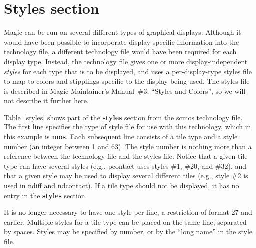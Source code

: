 \documentclass[letterpaper,twoside,12pt]{article}
\begin{document}
\section{Styles section}

Magic can be run on several different types of graphical displays.
Although it would have been possible to incorporate display-specific
information into the technology file,
a different technology file would have been required for each display type.
Instead, the technology file gives one or more display-independent
{\itshape styles} for each type that is to be displayed,
and uses a per-display-type styles file to map to
colors and stipplings specific to the display being used.  The
styles file is described in
Magic Maintainer's Manual\ \#3: ``Styles and Colors'',
so we will not describe it further here.

Table~\ref{styles} shows part of the {\bfseries styles}
section from the scmos technology file.
The first line specifies the type of style file
for use with this technology, which in this
example is {\bfseries mos}.
Each subsequent line consists of a tile type and a style number
(an integer between 1 and 63).
The style number is nothing more than a reference between the technology
file and the styles file.
Notice that a given tile type can have several styles
(e.g., pcontact uses styles \#1, \#20, and \#32),
and that a given style may be
used to display several different tiles
(e.g., style \#2 is used in ndiff and ndcontact).
If a tile type should not be displayed,
it has no entry in the {\bfseries styles} section.

It is no longer necessary to have one style per line, a restriction
of format 27 and earlier.  Multiple styles for a tile type can be
placed on the same line, separated by spaces.  Styles may be
specified by number, or by the ``long name'' in the style file.
\end{document}
